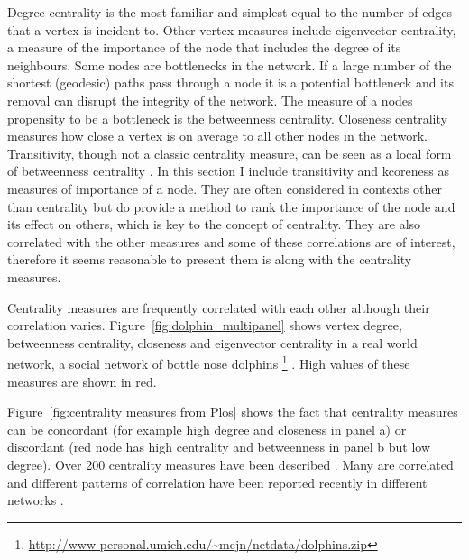 Degree centrality is the most familiar and simplest equal to the number of edges that a vertex is incident to. Other vertex measures include eigenvector centrality, a measure of the importance of the node that includes the degree of its neighbours\cite{bonacich1987power}.  Some nodes are bottlenecks in the network. If a large number of the shortest (geodesic) paths pass through a node it is a potential bottleneck and its removal can disrupt the integrity of the network. The measure of a nodes propensity to be a bottleneck is the betweenness centrality\cite{freeman1977set}. Closeness centrality measures how close a vertex is on average to all other nodes in the network. Transitivity, though not a classic centrality measure, can be seen as a local form of betweenness centrality \cite{newman2018networks}. In this section I include transitivity and kcoreness as  measures of importance of a node. They are often considered in contexts other than centrality but do provide a method to rank the importance of the node and its effect on others, which is key to the concept of centrality. They are also correlated with the other measures and some of these correlations are of interest, therefore it seems reasonable to present them is along with the centrality measures.

 Centrality measures are frequently correlated with each other \cite{valente2008correlated} although their correlation varies\cite{oldham2019consistency}. Figure~\ref{fig:dolphin_multipanel} shows vertex degree, betweenness centrality, closeness and eigenvector centrality in a real world network, a social network of bottle nose dolphins \footnote{\url{http://www-personal.umich.edu/~mejn/netdata/dolphins.zip}} \cite{lusseau2003bottlenose}. High values of these measures are shown in red. 

Figure~\ref{fig:centrality measures from Plos} shows the fact that centrality measures can be concordant (for example high degree and closeness in panel a) or discordant (red node has high centrality and betweenness in panel b but low degree). Over 200 centrality measures have been described \cite{jalili2015centiserver}. Many are correlated \cite{valente2008correlated} and different patterns of correlation have been reported recently in different networks \cite{oldham2019consistency}. 







